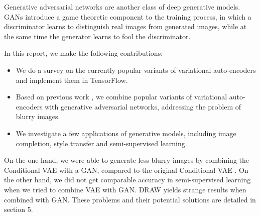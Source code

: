 \documentclass[10pt]{article}
\begin{document}
Generative adversarial networks are another class of deep generative models. GANs introduce a game theoretic component to the training process, in which a discriminator learns to distinguish real images from generated images, while at the same time the generator learns to fool the discriminator.

In this report, we make the following contributions:
\begin{itemize}
\item We do a survey on the currently popular variants of variational auto-encoders and implement them in TensorFlow.
\item Based on previous work \cite{larsen2015autoencoding}, we combine popular variants of variational auto-encoders with generative adversarial networks, addressing the problem of blurry images.
\item We investigate a few applications of generative models, including image completion, style transfer and semi-supervised learning.
\end{itemize}

On the one hand, we were able to generate less blurry images by combining the Conditional VAE with a GAN, compared to the original Conditional VAE \cite{sohn2015learning}.
On the other hand, we did not get comparable accuracy in semi-supervised learning when we tried to combine VAE with GAN. DRAW yields strange results when combined with GAN. These problems and their potential solutions are detailed in section 5.




\end{document}
